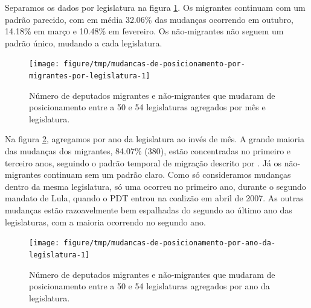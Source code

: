 \documentclass[a4paper,titlepage]{ppgi}\usepackage[]{graphicx}\usepackage[]{color}
\newenvironment{knitrout}{}{} %
\begin{document}
Separamos os dados por legislatura na figura
\ref{fig:mudancas-de-posicionamento-por-migrantes-por-legislatura}. Os
migrantes continuam com um padrão parecido, com em média
32.06\%
das mudanças ocorrendo em outubro,
14.18\%
em março e
10.48\%
em fevereiro. Os não-migrantes não seguem um padrão único, mudando a cada
legislatura.

\begin{knitrout}
\color{fgcolor}\begin{figure}
\texttt{[image: figure/tmp/mudancas-de-posicionamento-por-migrantes-por-legislatura-1]} \caption[Número de deputados migrantes e não-migrantes que mudaram de posicionamento entre a 50\textordfeminine{} e 54\textordfeminine{} legislaturas agregados por mês e legislatura]{Número de deputados migrantes e não-migrantes que mudaram de posicionamento entre a 50\textordfeminine{} e 54\textordfeminine{} legislaturas agregados por mês e legislatura.}\label{fig:mudancas-de-posicionamento-por-migrantes-por-legislatura}
\end{figure}


\end{knitrout}

Na figura \ref{fig:mudancas-de-posicionamento-por-ano-da-legislatura},
agregamos por ano da legislatura ao invés de mês. A grande maioria das
mudanças dos migrantes,
84.07\%
(380), estão concentradas no
primeiro e terceiro anos, seguindo o padrão temporal de migração descrito por
. Já os não-migrantes continuam sem um padrão claro.
Como só consideramos mudanças dentro da mesma legislatura, só uma ocorreu no
primeiro ano, durante o segundo mandato de Lula, quando o PDT entrou na
coalizão em abril de 2007. As outras mudanças estão razoavelmente bem
espalhadas do segundo ao último ano das legislaturas, com a maioria ocorrendo
no segundo ano.

\begin{knitrout}
\color{fgcolor}\begin{figure}
\texttt{[image: figure/tmp/mudancas-de-posicionamento-por-ano-da-legislatura-1]} \caption[Número de deputados migrantes e não-migrantes que mudaram de posicionamento entre a 50\textordfeminine{} e 54\textordfeminine{} legislaturas agregados por ano da legislatura]{Número de deputados migrantes e não-migrantes que mudaram de posicionamento entre a 50\textordfeminine{} e 54\textordfeminine{} legislaturas agregados por ano da legislatura.}\label{fig:mudancas-de-posicionamento-por-ano-da-legislatura}
\end{figure}


\end{knitrout}
\end{document}
